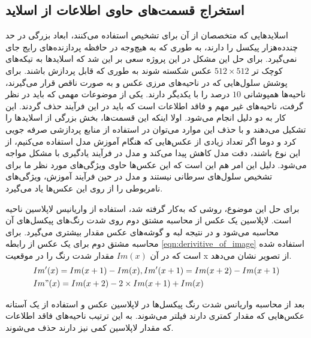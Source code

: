 \subsection{استخراج قسمت‌های حاوی اطلاعات از اسلاید}\label{subsec:استخراج قسمت‌های حاوی اطلاعات از اسلاید}

اسلاید‌هایی که متخصصان از آن برای تشخیص استفاده می‌کنند، ابعاد بزرگی در حد چند‌ده‌هزار پیکسل را دارند، به طوری که به هیچ‌وجه در
حافظه پردازنده‌های رایج جای نمی‌گیرد.
برای حل این مشکل در این پروژه سعی بر این شد که اسلاید‌ها به تیکه‌های کوچک تر
$512\times512$
 عکس شکسته شوند به طوری که قابل پردازش باشند.
 برای پوشش سلول‌هایی که در ناحیه‌های مرزی عکس و به صورت ناقص قرار می‌گیرند، ناحیه‌‌ها همپوشانی $10$ درصد را با یکدیگر دارند.
یکی از موضوعات مهمی که باید در نظر گرفت، ناحیه‌های غیر مهم و فاقد اطلاعات است که باید در این فرآیند حذف گردند. این کار به دو دلیل انجام می‌شود.
اولا اینکه این قسمت‌ها، بخش بزرگی از اسلاید‌ها را تشکیل می‌دهند و با حذف این موارد می‌توان در استفاده از منابع پردازشی صرفه جویی کرد
و دوما اگر تعداد زیادی از عکس‌هایی که هنگام آموزش مدل استفاده می‌کنیم، از این نوع باشند، دقت مدل کاهش پیدا می‌کند و مدل در فرآیند یادگیری با مشکل مواجه می‌شود.
دلیل این امر هم این است که این عکس‌ها حاوی ویژگی‌های مورد نظر ما برای تشخیص سلول‌های سرطانی نیستند و مدل در حین فرآیند آموزش، ویژگی‌های نامربوطی را از روی این عکس‌ها یاد می‌گیرد.

برای حل این موضوع، روشی که به‌کار گرفته شد، استفاده از واریانیس لاپلاسین ناحیه است.
لاپلاسین یک عکس از محاسبه مشتق دوم روی شدت رنگ‌های پیکسل‌های آن محاسبه می‌شود
و در نتیجه لبه و گوشه‌های عکس مقدار بیشتری می‌گیرد.
برای محاسبه مشتق دوم برای یک عکس از رابطه \ref{eqn:derivitive_of_image} استفاده شده است که در آن $Im(x)$ مقدار شدت رنگ را در موقعیت x از تصویر نشان می‌دهد.
\begin{equation}
	\label{eqn:derivitive_of_image}
		\begin{split}
			   & Im'(x) = Im(x+1) - Im(x), Im'(x+1) = Im(x+2) - Im(x+1)\\
			   & Im"(x) = Im(x+2) - 2 \times Im(x+1) + Im(x)
		\end{split}
\end{equation}

بعد از محاسبه واریانس شدت رنگ پیکسل‌ها در لاپلاسین عکس و استفاده از یک آستانه عکس‌هایی که مقدار کمتری دارند فیلتر می‌شوند.
به این ترتیب ناحیه‌های فاقد اطلاعات که مقدار لاپلاسین کمی نیز دارند حذف می‌شوند.

